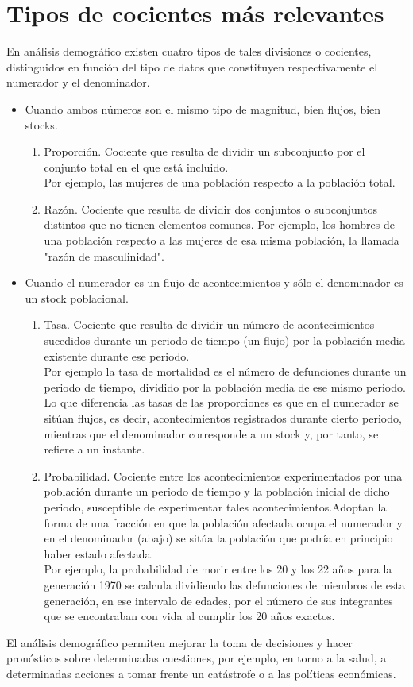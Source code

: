 \section{Tipos de cocientes más relevantes}
En análisis demográfico existen cuatro tipos de tales divisiones o cocientes, distinguidos en función del tipo de datos que constituyen respectivamente el numerador y el denominador.
\begin{itemize}
    \item Cuando ambos números son el mismo tipo de magnitud, bien flujos, bien stocks.
    \begin{enumerate}
        \item Proporción. Cociente que resulta de dividir un subconjunto por el conjunto total en el que está incluido.\\
        Por ejemplo, las mujeres de una población respecto a la población total.
        \item Razón. Cociente que resulta de dividir dos conjuntos o subconjuntos distintos que no tienen elementos comunes. Por ejemplo, los hombres de una población respecto a las mujeres de esa misma población, la llamada "razón de masculinidad".
    \end{enumerate}
    \item Cuando el numerador es un flujo de acontecimientos y sólo el denominador es un stock poblacional.
    \begin{enumerate}
        \item Tasa. Cociente que resulta de dividir un número de acontecimientos sucedidos durante un periodo de tiempo (un flujo) por la población media existente durante ese periodo.\\Por ejemplo la tasa de mortalidad es el número de defunciones durante un periodo de tiempo, dividido por la población media de ese mismo periodo. \\ Lo que diferencia las tasas de las proporciones es que en el numerador se sitúan flujos, es decir, acontecimientos registrados durante cierto periodo, mientras que el denominador corresponde a un stock y, por tanto, se refiere a un instante.
        \item Probabilidad. Cociente entre los acontecimientos experimentados por una población durante un periodo de tiempo y la población inicial de dicho periodo, susceptible de experimentar tales acontecimientos.Adoptan la forma de una fracción en que la población afectada ocupa el numerador y en el denominador (abajo) se sitúa la población que podría en principio haber estado afectada.\\Por ejemplo, la probabilidad de morir entre los 20 y los 22 años para la generación 1970 se calcula dividiendo las defunciones de miembros de esta generación, en ese intervalo de edades, por el número de sus integrantes que se encontraban con vida al cumplir los 20 años exactos.
    \end{enumerate}
\end{itemize}
El análisis demográfico permiten mejorar la toma de decisiones y hacer pronósticos sobre determinadas cuestiones, por ejemplo, en torno a la salud, a determinadas acciones a tomar frente un catástrofe o a las políticas económicas.
